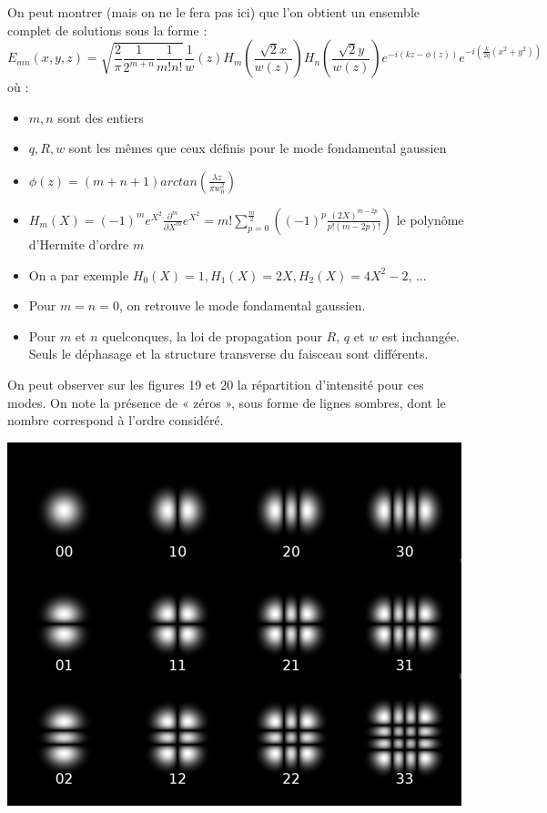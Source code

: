 \documentclass{book}
\begin{document}
On peut montrer (mais on ne le fera pas ici) que l'on obtient un ensemble complet de solutions sous la forme :
\[E_{mn}(x, y, z)=\sqrt{\frac 2\pi \frac 1{2^{m+n}}\frac 1{m!n!}}\frac 1w(z)H_m\left(\frac{\sqrt 2 x}{w(z)}\right)H_n\left(\frac{\sqrt 2 y}{w(z)}\right)e^{-i(kz-\phi(z))}e^{-i\left(\frac k{2q}(x^2+y^2)\right)}\]
où :

\begin{itemize}
    \item \(m, n\) sont des entiers
    \item \(q, R, w\) sont les mêmes que ceux définis pour le mode fondamental gaussien
    \item \(\phi(z)=(m+n+1)arctan\left(\frac {\lambda z}{\pi w_0^2}\right)\)
    \item \(H_m(X)=(-1)^me^{X^2}\frac {\partial ^m}{\partial X^m}e^{X^2}=m!\sum_{p=0}^{\frac m2}\left((-1)^p\frac{(2X)^{m-2p}}{p!(m-2p)!}\right)\) le polynôme d'Hermite d'ordre \(m\)
    \item On a par exemple \(H_0(X) = 1, H_1(X) = 2X, H_2(X) = 4X^2-2\), ...
    \item Pour \(m = n = 0\), on retrouve le mode fondamental gaussien.
    \item Pour \(m\) et \(n\) quelconques, la loi de propagation pour \(R\), \(q\) et \(w\) est inchangée. Seuls le déphasage et la structure transverse du faisceau sont différents.
\end{itemize}

On peut observer sur les figures 19 et 20 la répartition d'intensité pour ces modes. On note la présence de « zéros », sous forme de lignes sombres, dont le nombre correspond à l'ordre considéré.

{\centering
\includegraphics[scale=1.7]{images/fig19.jpg}
\par}
\end{document}
